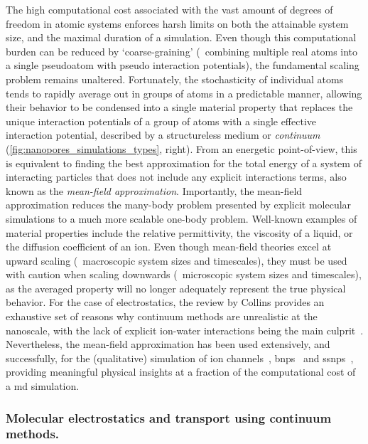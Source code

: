 The high computational cost associated with the vast amount of degrees of freedom in atomic systems enforces
harsh limits on both the attainable system size, and the maximal duration of a simulation. Even though this
computational burden can be reduced by `coarse-graining' (\ie~combining multiple real atoms into a single
pseudoatom with pseudo interaction potentials), the fundamental scaling problem remains unaltered.
Fortunately, the stochasticity of individual atoms tends to rapidly average out in groups of atoms in a
predictable manner, allowing their behavior to be condensed into a single material property that replaces the
unique interaction potentials of a group of atoms with a single effective interaction potential, described by
a structureless medium or \emph{continuum} (\cref{fig:nanopores_simulations_types}, right). From an energetic
point-of-view, this is equivalent to finding the best approximation for the total energy of a system of
interacting particles that does not include any explicit interactions terms, also known as the
\emph{mean-field approximation}. Importantly, the mean-field approximation reduces the many-body problem
presented by explicit molecular simulations to a much more scalable one-body problem. Well-known examples of
material properties include the relative permittivity, the viscosity of a liquid, or the diffusion coefficient
of an ion. Even though mean-field theories excel at upward scaling (\ie~macroscopic system sizes and
timescales), they must be used with caution when scaling downwards (\ie~microscopic system sizes and
timescales), as the averaged property will no longer adequately represent the true physical behavior. For the
case of electrostatics, the review by Collins provides an exhaustive set of reasons why continuum methods are
unrealistic at the nanoscale, with the lack of explicit ion-water interactions being the main
culprit~\cite{Collins-2012}. Nevertheless, the mean-field approximation has been used extensively, and
successfully, for the (qualitative) simulation of ion channels~\cite{Im-2002,Furini-2006,Liu-2015},
\glspl{bnp}~\cite{Simakov-2010,Pederson-2015,Aguilella-Arzo-2017,Simakov-2018} and
\glspl{ssnp}~\cite{Cervera-2005,White-2008,Chaudhry-2014,Laohakunakorn-2015}, providing meaningful physical
insights at a fraction of the computational cost of a \gls{md} simulation.


\subsubsection{Molecular electrostatics and transport using continuum methods.}
%


